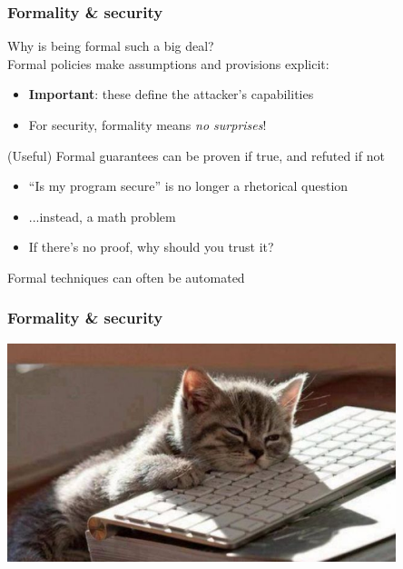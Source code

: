 \documentclass[10pt,handout]{beamer}
\begin{document}

\begin{frame}

\frametitle{Formality \& security}

Why is being formal such a big deal?
\\[1em]

\pause
Formal policies make assumptions and provisions explicit:
\begin{itemize}
  \item \textbf{Important}: these define the attacker's capabilities
  \item For security, formality means \emph{no surprises}! \\[1em]
\end{itemize}

\pause
(Useful) Formal guarantees can be proven if true, and refuted if not
\begin{itemize}
  \item ``Is my program secure'' is no longer a rhetorical question
  \item ...instead, a math problem
  \item If there's no proof, why should you trust it? \\[1em]
\end{itemize}

\pause
Formal techniques can often be automated

\end{frame}


\begin{frame}

\frametitle{Formality \& security}

\large
\centering

\includegraphics[width=0.85\textwidth]{lazycat.jpg}

\end{frame}
\end{document}
